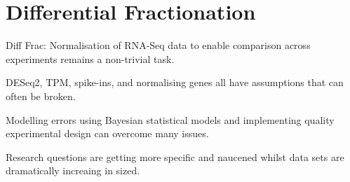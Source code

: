 \documentclass[../main.tex]{subfiles}
\begin{document}
\chapter{{Differential Fractionation}}
Diff Frac: Normalisation of RNA-Seq data to enable comparison across experiments remains a non-trivial task. 

DESeq2, TPM, spike-ins, and normalising genes all have assumptions that can often be broken.

Modelling errors using Bayesian statistical models and implementing quality experimental design can overcome many issues.

Research questions are getting more specific and naucened whilst data sets are dramatically increaing in sized. 
\end{document}
